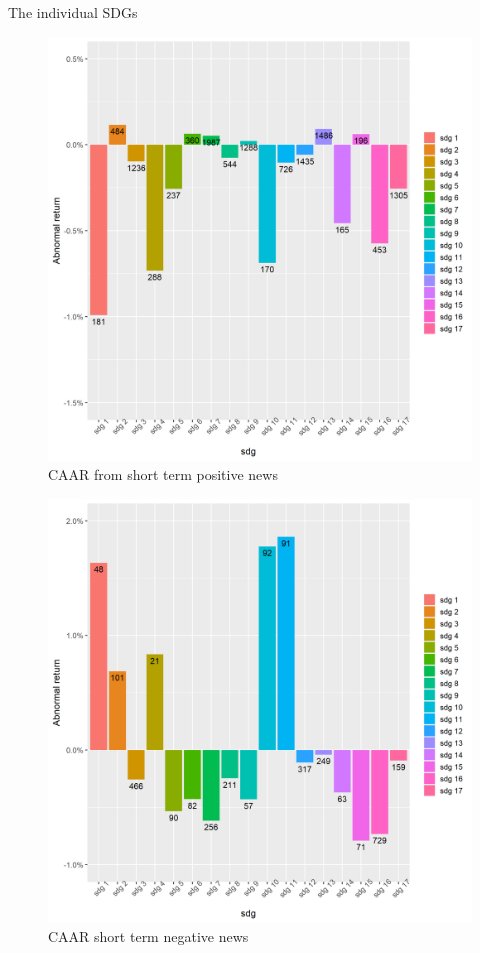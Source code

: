 The individual SDGs
\begin{figure} [H]
    \centering
    \includegraphics[scale=0.6]{Projekt/1.Figures analysis/ST_positive_sdg_bar.png}
    \caption{CAAR from short term positive news}
    \label{fig:ST_pos_news}
\end{figure}

\begin{figure} [H]
    \centering
    \includegraphics[scale=0.6]{Projekt/1.Figures analysis/ST_negative_sdg_bar.png}
    \caption{CAAR short term negative news}
    \label{fig:ST_pos_news}
\end{figure}




